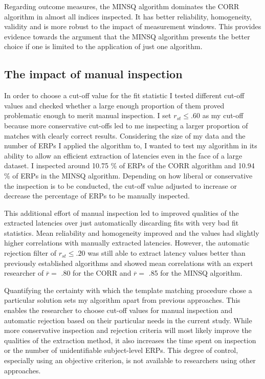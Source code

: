 \documentclass[
  man]{apa7}
\begin{document}
Regarding outcome measures, the MINSQ algorithm dominates the CORR algorithm in almost all indices inspected. It has better reliability, homogeneity, validity and is more robust to the impact of measurement windows. This provides evidence towards the argument that the MINSQ algorithm presents the better choice if one is limited to the application of just one algorithm.

\hypertarget{the-impact-of-manual-inspection}{%
\subsection{The impact of manual inspection}\label{the-impact-of-manual-inspection}}

In order to choose a cut-off value for the fit statistic I tested different cut-off values and checked whether a large enough proportion of them proved problematic enough to merit manual inspection. I set \(r_{st} \le .60\) as my cut-off because more conservative cut-offs led to me inspecting a larger proportion of matches with clearly correct results. Considering the size of my data and the number of ERPs I applied the algorithm to, I wanted to test my algorithm in its ability to allow an efficient extraction of latencies even in the face of a large dataset. I inspected around 10.75 \% of ERPs of the CORR algorithm and 10.94 \% of ERPs in the MINSQ algorithm. Depending on how liberal or conservative the inspection is to be conducted, the cut-off value adjusted to increase or decrease the percentage of ERPs to be manually inspected.

This additional effort of manual inspection led to improved qualities of the extracted latencies over just automatically discarding fits with very bad fit statistics. Mean reliability and homogeneity improved and the values had slightly higher correlations with manually extracted latencies. However, the automatic rejection filter of \(r_{st} \le .20\) was still able to extract latency values better than previously established algorithms and showed mean correlations with an expert researcher of \(\overline{r} =\) .80 for the CORR and \(\overline{r} =\) .85 for the MINSQ algorithm.

Quantifying the certainty with which the template matching procedure chose a particular solution sets my algorithm apart from previous approaches. This enables the researcher to choose cut-off values for manual inspection and automatic rejection based on their particular needs in the current study. While more conservative inspection and rejection criteria will most likely improve the qualities of the extraction method, it also increases the time spent on inspection or the number of unidentifiable subject-level ERPs. This degree of control, especially using an objective criterion, is not available to researchers using other approaches.
\end{document}
